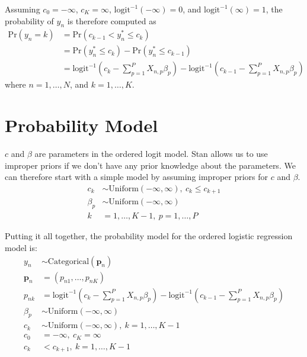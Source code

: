 \documentclass[12pt]{article}
\def\eqa{\left(c_k - \sum \limits_{p=1}^P X_{n,p}\beta_p \right)}
\def\eqb{\left(c_{k-1} - \sum \limits_{p=1}^P X_{n,p}\beta_p \right)}
\begin{document}
Assuming $c_0=-\infty$, $c_K=\infty$, $\mathrm{logit}^{-1}\left(-\infty\right)=0$, and $\mathrm{logit}^{-1}\left(\infty\right)=1$, the probability of $y_n$ is therefore computed as
\begin{align*}
 \mathrm{Pr}\left(y_n=k\right)&=\mathrm{Pr}\left(c_{k-1}<y^*_n\leq c_k\right)\\
 &= \mathrm{Pr}\left(y^*_n\leq c_k \right) - \mathrm{Pr}\left(y^*_n\leq c_{k-1} \right) \\
 &= \mathrm{logit}^{-1}\eqa - \mathrm{logit}^{-1}\eqb
\end{align*}
where $n=1,\ldots, N$, and $k=1, \ldots, K$.

\section{Probability Model}

$c$ and $\beta$ are parameters in the ordered logit model. Stan allows us to use improper priors if we don't have any prior knowledge about the parameters. We can therefore start with a simple model by assuming improper priors for $c$ and $\beta$.
\begin{align*}
  c_k &\sim \mathrm{Uniform}\left(-\infty, \infty \right), \ c_k \leq c_{k+1}\\
  \beta_p &\sim \mathrm{Uniform}\left(-\infty, \infty \right)\\
  k &=1,\ldots,K-1, \  p=1,\ldots,P
\end{align*}

Putting it all together, the probability model for the ordered logistic regression model is:
\begin{align*}
  y_n &\sim \mathrm{Categorical} \left(\mathbf{p}_n\right) \\
  \mathbf{p}_n &=\left(p_{n1},\ldots,p_{nK} \right) \\
  p_{nk} &= \mathrm{logit}^{-1}\eqa - \mathrm{logit}^{-1}\eqb \\
  \beta_p &\sim \mathrm{Uniform}\left(-\infty, \infty \right)\\
  c_k &\sim \mathrm{Uniform}\left(-\infty, \infty \right), \ k=1,\ldots,K-1 \\
  c_0 &= -\infty, \ c_K = \infty \\
  c_k &< c_{k+1}, \ k=1,\ldots,K-1
\end{align*}
\end{document}
